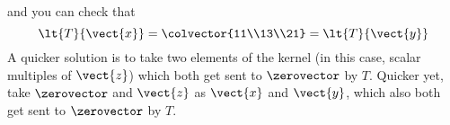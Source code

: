 %
and you can check that
%
\begin{equation*}
\lt{T}{\vect{x}}
=\colvector{11\\13\\21}
=\lt{T}{\vect{y}}
\end{equation*}
%
A quicker solution is to take two elements of the kernel (in this case, scalar multiples of $\vect{z}$) which both get sent to $\zerovector$ by $T$.  Quicker yet, take $\zerovector$ and $\vect{z}$ as $\vect{x}$ and $\vect{y}$, which also both get sent to $\zerovector$ by $T$.